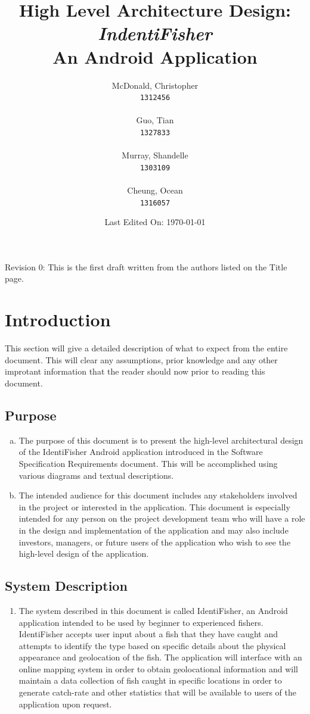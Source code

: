 \documentclass[]{article}
\title{High Level Architecture Design: \\ \textit{IndentiFisher} \\ An Android Application \\}
\author{
\Large McDonald, Christopher\\
\texttt{1312456} \\ \\
\Large Guo, Tian\\
\texttt{1327833} \\ \\
\Large Murray, Shandelle\\
\texttt{1303109} \\ \\
\Large Cheung, Ocean\\
\texttt{1316057} \\
}
\date{Last Edited On: \today}
\begin{document}
\maketitle

\newpage
\tableofcontents

\vfill
Revision 0: This is the first draft written from the authors listed on the Title page.
\pagebreak

\section{Introduction}
\label{sec:introduction}
This section will give a detailed description of what to expect from the entire document. This will clear any assumptions, prior knowledge and any other improtant information that the reader should now prior to reading this document.

\subsection{Purpose}
\label{sub:purpose}
\begin{enumerate}[a)]
	\item
	The purpose of this document is to present the high-level architectural design of the IdentiFisher Android application introduced in the Software Specification Requirements document. This will be accomplished using various diagrams and textual descriptions.
	\item
	The intended audience for this document includes any stakeholders involved in the project or interested in the application. This document is especially intended for any person on the project development team who will have a role in the design and implementation of the application and may also include investors, managers, or future users of the application who wish to see the high-level design of the application.
\end{enumerate}

\subsection{System Description}
\label{sub:system_description}
\begin{enumerate}[]
	\item
	The system described in this document is called IdentiFisher, an Android application intended to be used by beginner to experienced fishers. IdentiFisher accepts user input about a fish that they have caught and attempts to identify the type based on specific details about the physical appearance and geolocation of the fish. The application will interface with an online mapping system in order to obtain geolocational information and will maintain a data collection of fish caught in specific locations in order to generate catch-rate and other statistics that will be available to users of the application upon request.
\end{enumerate}
\end{document}
